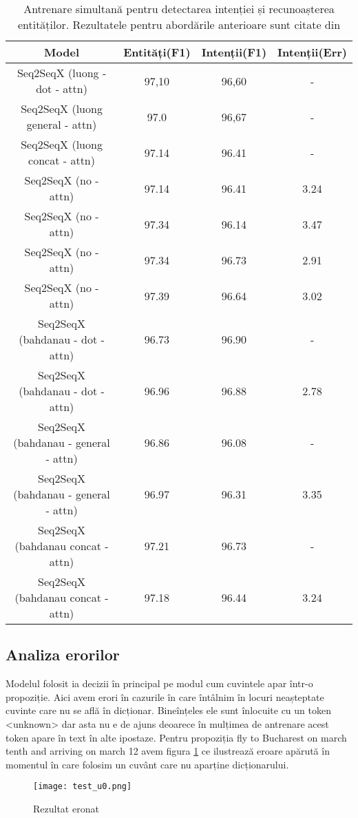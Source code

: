\bigskip
\begin{table}[htp]
	\small
	\centering
	\begin{tabular}{ c c c c} 
		\hline
		\textbf{Model} 		 & \textbf{Entități(F1)} & \textbf{Intenții(F1)} & \textbf{Intenții(Err)} \\
		\hline
		Seq2SeqX (luong - dot - attn) & 97,10 & 96,60 & - \\ %
		Seq2SeqX (luong general - attn) & 97.0 & 96,67 & - \\ %
		Seq2SeqX (luong concat - attn) & 97.14 & 96.41 & - \\ %
		\hline
		Seq2SeqX (no - attn) & 97.14 & 96.41 & 3.24 \\ %
		Seq2SeqX (no - attn) & 97.34 & 96.14 & 3.47 \\ %
		Seq2SeqX (no - attn) & 97.34 & 96.73 & 2.91 \\ %
		Seq2SeqX (no - attn) & 97.39 & 96.64 & 3.02 \\ %
		\hline
		Seq2SeqX (bahdanau - dot - attn) & 96.73 & 96.90 & - \\ %
		Seq2SeqX (bahdanau - dot - attn) & 96.96 & 96.88 & 2.78 \\ %
		\hline
		Seq2SeqX (bahdanau - general - attn) & 96.86 & 96.08 & - \\ %
		Seq2SeqX (bahdanau - general - attn) & 96.97 & 96.31 & 3.35 \\ %
		\hline
		Seq2SeqX (bahdanau concat - attn) & 97.21 & 96.73 & - \\ %
		Seq2SeqX (bahdanau concat - attn) & 97.18 & 96.44 & 3.24 \\ %
		\hline
	\end{tabular}
	\caption{Antrenare simultană pentru detectarea intenției și recunoașterea entităților. Rezultatele pentru abordările anterioare sunt citate din \cite{att_joint_bing}}
	\label{rezultate2}
\end{table}

\subsection{Analiza erorilor}

Modelul folosit ia decizii în principal pe modul cum cuvintele apar într-o propoziție. Aici avem erori în cazurile în care întâlnim în locuri neașteptate cuvinte care nu se află în dicționar. Bineînțeles ele sunt înlocuite cu un token  <unknown> dar asta nu e de ajuns deoarece în mulțimea de antrenare acest token apare în text în alte ipostaze.
Pentru propoziția {\ttfamily fly to Bucharest on march tenth and arriving on march 12} avem figura \ref{fig:test_u0} ce ilustrează eroare apărută în momentul în care folosim un cuvânt care nu aparține dicționarului.
\begin{figure}[h]
	\centering
	\texttt{[image: test\_u0.png]}
	\caption{Rezultat eronat}
	\label{fig:test_u0}
\end{figure}

